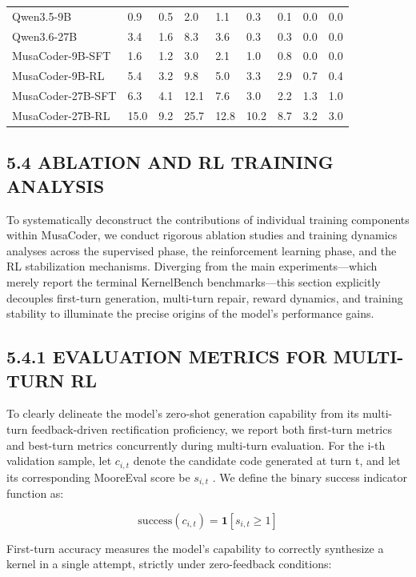 \documentclass[
  10
]{article}
\begin{document}
{\begin{longtable}[]{@{}lllllllll@{}}
Qwen3.5-9B & 0.9 & 0.5 & 2.0 & 1.1 & 0.3 & 0.1 & 0.0 & 0.0 \\
Qwen3.6-27B & 3.4 & 1.6 & 8.3 & 3.6 & 0.3 & 0.3 & 0.0 & 0.0 \\
MusaCoder-9B-SFT & 1.6 & 1.2 & 3.0 & 2.1 & 1.0 & 0.8 & 0.0 & 0.0 \\
MusaCoder-9B-RL & 5.4 & 3.2 & 9.8 & 5.0 & 3.3 & 2.9 & 0.7 & 0.4 \\
MusaCoder-27B-SFT & 6.3 & 4.1 & 12.1 & 7.6 & 3.0 & 2.2 & 1.3 & 1.0 \\
MusaCoder-27B-RL & 15.0 & 9.2 & 25.7 & 12.8 & 10.2 & 8.7 & 3.2 & 3.0 \\
\end{longtable}
}

\subsection{5.4 ABLATION AND RL TRAINING
ANALYSIS}\label{ablation-and-rl-training-analysis}

To systematically deconstruct the contributions of individual training
components within MusaCoder, we conduct rigorous ablation studies and
training dynamics analyses across the supervised phase, the
reinforcement learning phase, and the RL stabilization mechanisms.
Diverging from the main experiments---which merely report the terminal
KernelBench benchmarks---this section explicitly decouples first-turn
generation, multi-turn repair, reward dynamics, and training stability
to illuminate the precise origins of the model's performance gains.

\subsection{5.4.1 EVALUATION METRICS FOR MULTI-TURN
RL}\label{evaluation-metrics-for-multi-turn-rl}

To clearly delineate the model's zero-shot generation capability from
its multi-turn feedback-driven rectification proficiency, we report both
first-turn metrics and best-turn metrics concurrently during multi-turn
evaluation. For the i-th validation sample, let \(c _ { i , t }\) denote
the candidate code generated at turn t, and let its corresponding
MooreEval score be \(s _ { i , t }\) . We define the binary success
indicator function as:

\[
\mathrm{success} (c _ {i, t}) = \mathbf {1} [ s _ {i, t} \geq 1 ]\tag{22}
\]

First-turn accuracy measures the model's capability to correctly
synthesize a kernel in a single attempt, strictly under zero-feedback
conditions:
\end{document}
